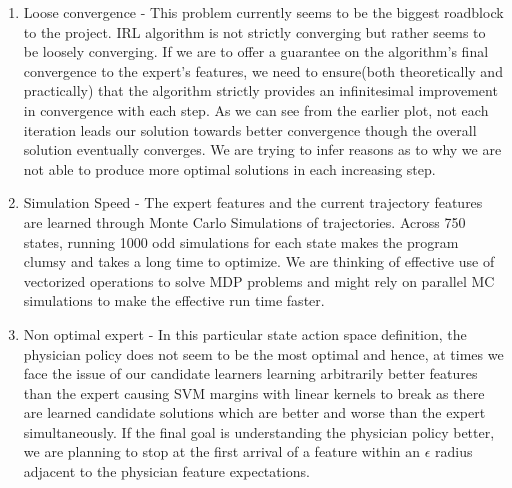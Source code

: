\documentclass[twoside,11pt]{article}
\begin{document}
\begin{itemize}
\begin{enumerate}
\item Loose convergence - This problem currently seems to be the biggest roadblock to the project. IRL algorithm is not strictly converging but rather seems to be loosely converging. If we are to offer a guarantee on the algorithm's final convergence to the expert's features, we need to ensure(both theoretically and practically) that the algorithm strictly provides an infinitesimal improvement in convergence with each step. As we can see from the earlier plot, not each iteration leads our solution towards better convergence though the overall solution eventually converges.  We are trying to infer reasons as to why we are not able to produce more optimal solutions in each increasing step.
\item Simulation Speed - The expert features and the current trajectory features are learned through Monte Carlo Simulations of trajectories. Across 750 states, running 1000 odd simulations for each state makes the program clumsy and takes a long time to optimize. We are thinking of effective use of vectorized operations to solve MDP problems and might rely on parallel MC simulations to make the effective run time faster.
\item Non optimal expert - In this particular state action space definition, the physician policy does not seem to be the most optimal and hence, at times we face the issue of our candidate learners learning arbitrarily better features than the expert causing SVM margins with linear kernels to break as there are learned candidate solutions which are better and worse than the expert simultaneously. If the final goal is understanding the physician policy better, we are planning to stop at the first arrival of a feature within an $\epsilon$ radius adjacent to the physician feature expectations.
\end{enumerate}
\end{itemize}
\end{document}
